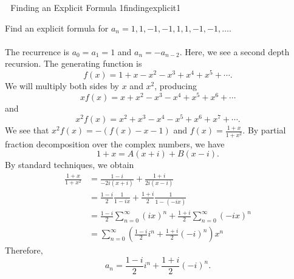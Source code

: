         \begin{exercise}{\Difficulty\,\Difficulty\,\Difficulty\,\,Finding an Explicit Formula 1}{findingexplicit1}
        
            Find an explicit formula for \(a_n=1,1,-1,-1,1,1,-1,-1,\ldots\).
            \\
            \\
            The recurrence is \(a_0=a_1=1\) and \(a_n=-a_{n-2}\). Here, we see a second depth recursion. The generating function is
            \begin{equation*}
                f(x)=1+x-x^2-x^3+x^4+x^5+\cdots.
            \end{equation*}
            We will multiply both sides by \(x\) and \(x^2\), producing
            \begin{equation*}
                xf(x)=x+x^2-x^3-x^4+x^5+x^6+\cdots
            \end{equation*}
            and
            \begin{equation*}
                x^2f(x)=x^2+x^3-x^4-x^5+x^6+x^7+\cdots.
            \end{equation*}
            We see that \(x^2f(x)=-(f(x)-x-1)\) and \(f(x)=\frac{1+x}{1+x^2}\). By partial fraction decomposition over the complex numbers, we have
            \begin{equation*}
                1+x=A(x+i)+B(x-i).
            \end{equation*}
            By standard techniques, we obtain
            \begin{align*}
                \frac{1+x}{1+x^2}&=\frac{1-i}{-2i(x+i)}+\frac{1+i}{2i(x-i)} \\
                &=\frac{1-i}{2}\frac{1}{1-ix}+\frac{1+i}{2}\frac{1}{1-(-ix)} \\
                &=\frac{1-i}{2}\sum_{n=0}^\infty (ix)^n+\frac{1+i}{2}\sum_{n=0}^\infty (-ix)^n \\
                &=\sum_{n=0}^\infty\left(\frac{1-i}{2}i^n+\frac{1+i}{2}(-i)^n\right)x^n
            \end{align*}
            Therefore,
            \begin{equation*}
                a_n=\frac{1-i}{2}i^n+\frac{1+i}{2}(-i)^n.
            \end{equation*}
            
        \end{exercise}
        \pagebreak
        \vphantom
        \\
        \\
